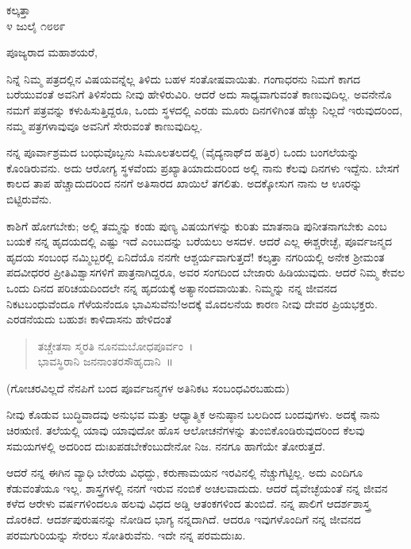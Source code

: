 \begin{flushright}
ಕಲ್ಕತ್ತಾ\\೪ ಜುಲೈ ೧೮೮೯
\end{flushright}

\noindent
ಪೂಜ್ಯರಾದ ಮಹಾಶಯರೆ,

ನಿನ್ನೆ ನಿಮ್ಮ ಪತ್ರದಲ್ಲಿನ ವಿಷಯವನ್ನೆಲ್ಲ ತಿಳಿದು ಬಹಳ ಸಂತೋಷವಾಯಿತು. ಗಂಗಾಧರನು ನಿಮಗೆ ಕಾಗದ ಬರೆಯುವಂತೆ ಅವನಿಗೆ ತಿಳಿಸೆಂದು ನೀವು ಹೇಳಿರುವಿರಿ. ಆದರೆ ಅದು ಸಾಧ್ಯವಾಗುವಂತೆ ಕಾಣುವುದಿಲ್ಲ. ಅವನೇನೊ ನಮಗೆ ಪತ್ರವನ್ನು ಕಳುಹಿಸು\break ತ್ತಿದ್ದರೂ, ಒಂದು ಸ್ಥಳದಲ್ಲಿ ಎರಡು ಮೂರು ದಿನಗಳಿಗಿಂತ ಹೆಚ್ಚು ನಿಲ್ಲದೆ ಇರುವುದರಿಂದ, ನಮ್ಮ ಪತ್ರಗಳಾವುವೂ ಅವನಿಗೆ ಸೇರುವಂತೆ ಕಾಣುವುದಿಲ್ಲ.

ನನ್ನ ಪೂರ್ವಾಶ್ರಮದ ಬಂಧುವೊಬ್ಬನು ಸಿಮೂಲತಲದಲ್ಲಿ (ವೈದ್ಯನಾಥ್‌ದ ಹತ್ತಿರ) ಒಂದು ಬಂಗಲೆಯನ್ನು ಕೊಂಡಿರುವನು. ಅದು ಆರೋಗ್ಯ ಸ್ಥಳವೆಂದು ಪ್ರಖ್ಯಾತಿಯಾದುದರಿಂದ ಅಲ್ಲಿ ನಾನು ಕೆಲವು ದಿನಗಳು ಇದ್ದೆನು. ಬೇಸಗೆ ಕಾಲದ ತಾಪ ಹೆಚ್ಚಾದುದರಿಂದ ನನಗೆ ಅತಿಸಾರದ ಖಾಯಿಲೆ ತಗಲಿತು. ಅದಕ್ಕೋಸುಗ ನಾನು ಆ ಊರನ್ನು ಬಿಟ್ಟಿರುವೆನು.

ಕಾಶಿಗೆ ಹೋಗಬೇಕು; ಅಲ್ಲಿ ತಮ್ಮನ್ನು ಕಂಡು ಪುಣ್ಯ ವಿಷಯಗಳನ್ನು ಕುರಿತು ಮಾತನಾಡಿ ಪುನೀತನಾಗಬೇಕು ಎಂಬ ಬಯಕೆ ನನ್ನ ಹೃದಯದಲ್ಲಿ ಎಷ್ಟು ಇದೆ ಎಂಬುದನ್ನು ಬರೆಯಲು ಅಸದಳ. ಆದರೆ ಎಲ್ಲ ಈಶ್ಚರೇಚ್ಛೆ, ಪೂರ್ವಜನ್ಮದ ಹೃದಯ ಸಂಬಂಧ ನಮ್ಮಿಬ್ಬರಲ್ಲಿ ಏನಿದೆಯೊ ನನಗೇ ಆಶ್ಚರ್ಯವಾಗುತ್ತದೆ! ಕಲ್ಕತ್ತಾ ನಗರಿಯಲ್ಲಿ ಅನೇಕ ಶ‍್ರೀಮಂತ ಪದವೀಧರರ ಪ್ರೀತಿವಿಶ್ವಾಸಗಳಿಗೆ ಪಾತ್ರನಾಗಿದ್ದರೂ, ಅವರ ಸಂಗದಿಂದ ಬೇಜಾರು ಹಿಡಿಯುವುದು. ಆದರೆ ನಿಮ್ಮ ಕೇವಲ ಒಂದು ದಿನದ ಪರಿಚಯದಿಂದಲೇ ನನ್ನ ಹೃದಯಕ್ಕೆ ಅತ್ಯಾನಂದವಾಯಿತು. ನಿಮ್ಮನ್ನು ನನ್ನ ಜೀವನದ ನಿಕಟಬಂಧುವೆಂದೂ ಗೆಳೆಯನೆಂದೂ ಭಾವಿಸುವೆನು!ಅದಕ್ಕೆ ಮೊದಲನೆಯ ಕಾರಣ ನೀವು ದೇವರ ಪ್ರಿಯಭಕ್ತರು. ಎರಡನೆಯದು ಬಹುಶಃ ಕಾಳಿದಾಸನು ಹೇಳಿದಂತೆ \enginline{-}

\begin{verse}
 ತಚ್ಚೇತಸಾ ಸ್ಮರತಿ ನೂನಮಬೋಧಪೂರ್ವಂ~।\\
 ಭಾವಸ್ಥಿರಾನಿ ಜನನಾಂತರಸೌಹೃದಾನಿ~॥ 
\end{verse}
\vspace{-0.5cm}


(ಗೋಚರವಿಲ್ಲದೆ ನೆನಪಿಗೆ ಬಂದ ಪೂರ್ವಜನ್ಮಗಳ ಅತಿನಿಕಟ ಸಂಬಂಧವಿರಬಹುದು)

ನೀವು ಕೊಡುವ ಬುದ್ಧಿವಾದವು ಅನುಭವ ಮತ್ತು ಆಧ್ಯಾತ್ಮಿಕ ಅನುಷ್ಠಾನ ಬಲದಿಂದ ಬಂದವುಗಳು. ಅದಕ್ಕೆ ನಾನು ಚಿರಋಣಿ. ತಲೆಯಲ್ಲಿ ಯಾವು ಯಾವುದೋ ಹೊಸ ಆಲೋಚನೆಗಳನ್ನು ತುಂಬಿಕೊಂಡಿರುವುದರಿಂದ ಕೆಲವು ಸಮಯಗಳಲ್ಲಿ ಅದರಿಂದ ದುಃಖಪಡಬೇಕೆಂಬುದೇನೋ ನಿಜ. ನನಗೂ ಹಾಗೆಯೇ ತೋರುತ್ತದೆ.

ಆದರೆ ನನ್ನ ಈಗಿನ ವ್ಯಾಧಿ ಬೇರೆಯ ವಿಧದ್ದು, ಕರುಣಾಮಯನ ಇರವಿನಲ್ಲಿ ನೆಚ್ಚುಗೆಟ್ಟಿಲ್ಲ. ಅದು ಎಂದಿಗೂ ಕೆಡುವಂತೆಯೂ ಇಲ್ಲ. ಶಾಸ್ತ್ರಗಳಲ್ಲಿ ನನಗೆ ಇರುವ ನಂಬಿಕೆ ಅಚಲವಾದುದು. ಆದರೆ ದೈವೇಚ್ಛೆಯಂತೆ ನನ್ನ ಜೀವನ ಕಳೆದ ಆರೇಳು ವರ್ಷಗಳಿಂದಲೂ ಹಲವು ವಿಧದ ಅಡ್ಡಿ ಆತಂಕಗಳಿಂದ ತುಂಬಿದೆ. ನನ್ನ ಪಾಲಿಗೆ ಆದರ್ಶಶಾಸ್ತ್ರ ದೊರಕಿದೆ. ಆದರ್ಶಪುರುಷನನ್ನು ನೋಡಿದ ಭಾಗ್ಯ ನನ್ನದಾಗಿದೆ. ಆದರೂ ಇವುಗಳೊಂದಿಗೆ ನನ್ನ ಜೀವನದ ಪರಮಗುರಿಯನ್ನು ಸೇರಲು ಸೋತಿರುವೆನು. ಇದೇ ನನ್ನ ಪರಮದುಃಖ.


